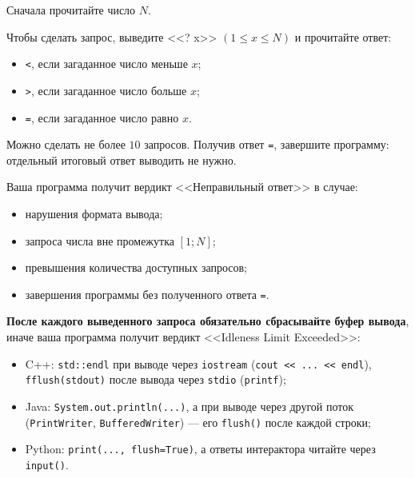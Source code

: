Сначала прочитайте число $N$.

Чтобы сделать запрос, выведите <<? x>> $(1 \le x \le N)$ и прочитайте ответ:

\begin{itemize}
\item \texttt{<}, если загаданное число меньше $x$;
\item \texttt{>}, если загаданное число больше $x$;
\item \texttt{=}, если загаданное число равно $x$.
\end{itemize}

Можно сделать не более $10$ запросов. Получив ответ \texttt{=}, завершите программу: отдельный итоговый ответ выводить не нужно.

Ваша программа получит вердикт <<Неправильный ответ>> в случае:

\begin{itemize}
\item нарушения формата вывода;
\item запроса числа вне промежутка $[1; N]$;
\item превышения количества доступных запросов;
\item завершения программы без полученного ответа \texttt{=}.
\end{itemize}

\textbf{После каждого выведенного запроса обязательно сбрасывайте буфер вывода}, иначе ваша программа получит вердикт <<Idleness Limit Exceeded>>:

\begin{itemize}
\item C++: \texttt{std::endl} при выводе через \texttt{iostream} (\texttt{cout << ... << endl}), \texttt{fflush(stdout)} после вывода через \texttt{stdio} (\texttt{printf});
\item Java: \texttt{System.out.println(...)}, а при выводе через другой поток (\texttt{PrintWriter}, \texttt{BufferedWriter}) --- его \texttt{flush()} после каждой строки;
\item Python: \texttt{print(..., flush=True)}, а ответы интерактора читайте через \texttt{input()}.
\end{itemize}

